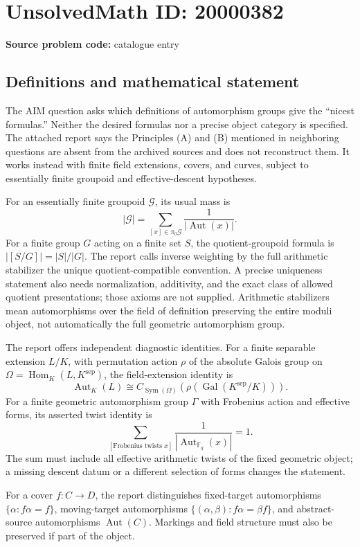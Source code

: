 \documentclass[11pt]{article}
\newcommand{\F}{\mathbb{F}}
\begin{document}
\section*{UnsolvedMath ID: 20000382}
\textbf{Source problem code:} catalogue entry
\subsection{Definitions and mathematical statement}
The AIM question asks which definitions of automorphism groups give the ``nicest formulas.'' Neither the desired formulas nor a precise object category is specified. The attached report says the Principles (A) and (B) mentioned in neighboring questions are absent from the archived sources and does not reconstruct them. It works instead with finite field extensions, covers, and curves, subject to essentially finite groupoid and effective-descent hypotheses.

For an essentially finite groupoid \(\mathcal G\), its usual mass is
\[
|\mathcal G|=\sum_{[x]\in\pi_0\mathcal G}\frac1{|\operatorname{Aut}(x)|}.
\]
For a finite group \(G\) acting on a finite set \(S\), the quotient-groupoid formula is \(|[S/G]|=|S|/|G|\). The report calls inverse weighting by the full arithmetic stabilizer the unique quotient-compatible convention. A precise uniqueness statement also needs normalization, additivity, and the exact class of allowed quotient presentations; those axioms are not supplied. Arithmetic stabilizers mean automorphisms over the field of definition preserving the entire moduli object, not automatically the full geometric automorphism group.

The report offers independent diagnostic identities. For a finite separable extension \(L/K\), with permutation action \(\rho\) of the absolute Galois group on \(\Omega=\operatorname{Hom}_K(L,K^{\mathrm{sep}})\), the field-extension identity is
\[
\operatorname{Aut}_K(L)\cong C_{\operatorname{Sym}(\Omega)}(\rho(\operatorname{Gal}(K^{\mathrm{sep}}/K))).
\]
For a finite geometric automorphism group \(\Gamma\) with Frobenius action and effective forms, its asserted twist identity is
\[
\sum_{[\text{Frobenius twists }x]}\frac1{|\operatorname{Aut}_{\F_q}(x)|}=1.
\]
The sum must include all effective arithmetic twists of the fixed geometric object; a missing descent datum or a different selection of forms changes the statement.

For a cover \(f:C\to D\), the report distinguishes fixed-target automorphisms \(\{\alpha:f\alpha=f\}\), moving-target automorphisms \(\{(\alpha,\beta):f\alpha=\beta f\}\), and abstract-source automorphisms \(\operatorname{Aut}(C)\). Markings and field structure must also be preserved if part of the object.
\end{document}
